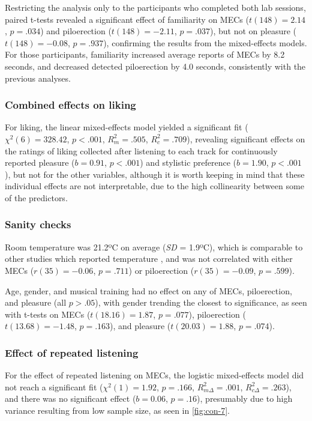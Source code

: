 Restricting the analysis only to the participants who completed both lab sessions, paired t-tests revealed a significant effect of familiarity on MECs ($t(148) = 2.14$, $p = .034$) and piloerection ($t(148) = -2.11$, $p = .037$), but not on pleasure ($t(148) = -0.08$, $p = .937$), confirming the results from the mixed-effects models. For those participants, familiarity increased average reports of MECs by 8.2 seconds, and decreased detected piloerection by 4.0 seconds, consistently with the previous analyses.

\subsubsection{Combined effects on liking}

For liking, the linear mixed-effects model yielded a significant fit ($\chi^2(6) = 328.42$, $p < .001$, $R^2_m = .505$, $R^2_c = .709$), revealing significant effects on the ratings of liking collected after listening to each track for continuously reported pleasure ($b = 0.91$, $p < .001$) and stylistic preference ($b = 1.90$, $p < .001$), but not for the other variables, although it is worth keeping in mind that these individual effects are not interpretable, due to the high collinearity between some of the predictors.

\subsubsection{Sanity checks}

Room temperature was 21.2ºC on average (\emph{SD} = 1.9ºC), which is comparable to other studies which reported temperature \parencite{benedek2011,laeng2016}, and was not correlated with either MECs ($r(35) = -0.06$, $p = .711$) or piloerection ($r(35) = -0.09$, $p = .599$).

Age, gender, and musical training had no effect on any of MECs, piloerection, and pleasure (all $p > .05$), with gender trending the closest to significance, as seen with t-tests on MECs ($t(18.16) = 1.87$, $p = .077$), piloerection ($t(13.68) = -1.48$, $p = .163$), and pleasure ($t(20.03) = 1.88$, $p = .074$).

\subsubsection{Effect of repeated listening}

For the effect of repeated listening on MECs, the logistic mixed-effects model did not reach a significant fit ($\chi^2(1) = 1.92$, $p = .166$, $R^2_{m\Delta} = .001$, $R^2_{c\Delta} = .263$), and there was no significant effect ($b = 0.06$, $p = .16$), presumably due to high variance resulting from low sample size, as seen in \autoref{fig:con-7}.

